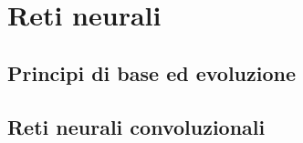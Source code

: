 
\chapter{Reti neurali}\label{chp:neural-networks}

\section{Principi di base ed evoluzione}



\section{Reti neurali convoluzionali}

